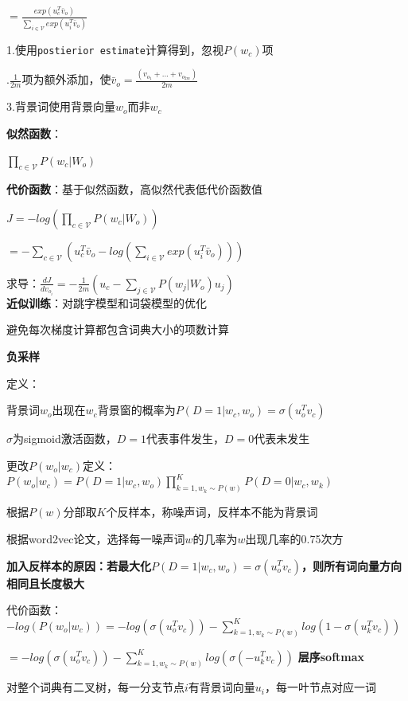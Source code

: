 \documentclass[UTF8]{ctexart}
\begin{document}
  \quad \quad $= \frac{exp(u_c^T\bar{v}_o)}{\sum_{i\in \mathcal{V} } exp(u_i^T\bar{v}_o )}$

  \quad 1.使用\texttt{postierior estimate}计算得到，忽视$P(w_c)$项

  .$\frac{1}{2m}$项为额外添加，使$\bar{v}_o = \frac{(v_{o_1} + ... + v_{o_{2m}})}{2m}$

  \quad 3.背景词使用背景向量$w_o$而非$w_c$
  
  \textbf{似然函数}：

  \quad $\prod_{c \in \mathcal{V} } P(w_c | W_o)$

  \textbf{代价函数}：基于似然函数，高似然代表低代价函数值

  \quad $J = -log(\prod_{c \in \mathcal{V} } P(w_c | W_o))$

  \quad \quad $= -\sum_{c \in \mathcal{V} } (u_c^T\bar{v}_o - log(\sum_{i\in \mathcal{V} } exp(u_i^T\bar{v}_o )))$

  \quad 求导：$\frac{d J}{d v_{o_i}} = -\frac{1}{2m}(u_c - \sum_{j \in \mathcal{V} }P(w_j | W_o)u_j)$\\
\textbf{近似训练}：对跳字模型和词袋模型的优化

  避免每次梯度计算都包含词典大小的项数计算

  \textbf{负采样}

  \quad 定义：

  \quad \quad 背景词$w_o$出现在$w_c$背景窗的概率为$P(D = 1|w_c, w_o) = \sigma(u_o^Tv_c)$

  \quad \quad \quad $\sigma$为sigmoid激活函数，$D = 1$代表事件发生，$D = 0$代表未发生

  \quad 更改$P(w_o | w_c)$定义：$P(w_o | w_c) = P(D = 1| w_c, w_o)\prod_{k=1, w_k \sim P(w)}^{K}P(D = 0 | w_c, w_k)$

  \quad \quad 根据$P(w)$分部取$K$个反样本，称噪声词，反样本不能为背景词

  \quad \quad \quad 根据word2vec论文，选择每一噪声词$w$的几率为$w$出现几率的0.75次方

  \quad \quad \textbf{加入反样本的原因：若最大化$P(D = 1|w_c, w_o) = \sigma(u_o^Tv_c)$，则所有词向量方向相同且长度极大}

  \quad 代价函数：$-log(P(w_o | w_c)) = -log(\sigma(u_o^Tv_c)) - \sum_{k=1, w_k \sim P(w)}^{K}log(1-\sigma(u_k^Tv_c))$

  \quad \quad $ = -log(\sigma(u_o^Tv_c)) - \sum_{k=1, w_k \sim P(w)}^{K}log(\sigma(-u_k^Tv_c))$
  \textbf{层序softmax}
  
  \quad 对整个词典有二叉树，每一分支节点$i$有背景词向量$u_i$，每一叶节点对应一词
\end{document}
